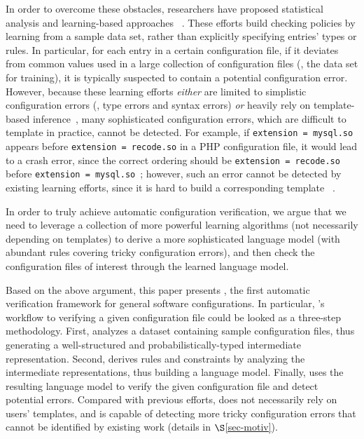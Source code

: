 In order to overcome these obstacles,
researchers have proposed 
statistical analysis and learning-based approaches%
~\cite{wang04automatic, zhang14encore, yuan11context}. 
These efforts build checking policies by learning from a sample 
data set, rather than explicitly specifying entries' types or rules.
In particular, for each entry in a certain configuration file, 
if it deviates from common values used in a large collection
of configuration files (\ie, the data set for training), it is typically
suspected to contain a potential configuration error.
However, because these learning 
efforts {\em either} are limited to simplistic 
configuration errors (\eg, type errors and syntax errors)
{\em or} heavily rely on template-based inference~\cite{zhang14encore}, 
many sophisticated configuration errors, 
which are difficult to template in practice, cannot be detected.
For example, if {\tt extension = mysql.so} appears 
before {\tt extension = recode.so} in a PHP configuration file,  
it would lead to a crash error, since the correct ordering 
should be {\tt extension = recode.so} before 
{\tt extension = mysql.so}~\cite{yin11anempirical};
however, such an error cannot be detected by existing
learning efforts, since it is hard to build a corresponding template ~\cite{xu15systems}.


In order to truly achieve automatic configuration verification,
we argue that we need to leverage a collection of more powerful learning 
algorithms (not necessarily depending on templates) to derive 
a more sophisticated language model (with abundant rules covering
tricky configuration errors), and then check the configuration files
of interest through the learned language model.

Based on the above argument, 
this paper presents \app, the first automatic verification framework
for general software configurations.
In particular, \app's workflow to verifying a given configuration file
could be looked as a three-step methodology.
First, \app analyzes a dataset containing sample configuration files,
thus generating a well-structured and probabilistically-typed 
intermediate representation.
Second, \app derives rules and constraints by analyzing
the intermediate representations, thus building a language model.
Finally, \app uses the resulting language model
to verify the given configuration file and detect potential errors.
Compared with previous efforts,
\app does not necessarily rely on users' templates, 
and is capable of detecting more tricky configuration errors that
cannot be identified by existing work (details in $\S$\ref{sec-motiv}). 

